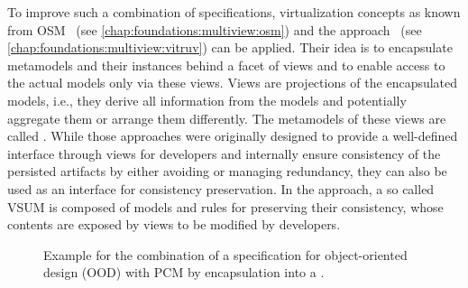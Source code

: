 To improve such a combination of specifications, virtualization concepts as known from \gls{OSM}~\cite{atkinson2010a} (see \autoref{chap:foundations:multiview:osm}) and the \vitruv approach~ (see \autoref{chap:foundations:multiview:vitruv}) can be applied.
Their idea is to encapsulate metamodels and their instances behind a facet of views and to enable access to the actual models only via these views.
Views are projections of the encapsulated models, i.e., they derive all information from the models and potentially aggregate them or arrange them differently.
The metamodels of these views are called \emph{\viewtypes}.
While those approaches were originally designed to provide a well-defined interface through views for developers and internally ensure consistency of the persisted artifacts by either avoiding or managing redundancy, they can also be used as an interface for consistency preservation.
In the \vitruv approach, a so called \gls{VSUM} is composed of models and rules for preserving their consistency, whose contents are exposed by views to be modified by developers.

\begin{figure}
    \centering
    
    \caption[Combination of \commonalities with a transformation]{Example for the combination of a \commonalities specification for object-oriented design (OOD) with \gls{PCM} by encapsulation into a \vsumm.}
    \label{fig:improvement:combination_external_metamodel}
\end{figure}

